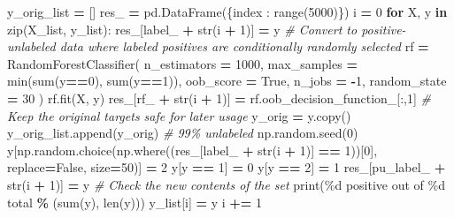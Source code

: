 \documentclass[
  11pt,
  oneside]{book}
\newenvironment{Shaded}{\begin{snugshade}}{\end{snugshade}}
\newcommand{\BuiltInTok}[1]{#1}
\newcommand{\CommentTok}[1]{\textcolor[rgb]{0.56,0.35,0.01}{\textit{#1}}}
\newcommand{\ControlFlowTok}[1]{\textcolor[rgb]{0.13,0.29,0.53}{\textbf{#1}}}
\newcommand{\DecValTok}[1]{\textcolor[rgb]{0.00,0.00,0.81}{#1}}
\newcommand{\KeywordTok}[1]{\textcolor[rgb]{0.13,0.29,0.53}{\textbf{#1}}}
\newcommand{\NormalTok}[1]{#1}
\newcommand{\OperatorTok}[1]{\textcolor[rgb]{0.81,0.36,0.00}{\textbf{#1}}}
\newcommand{\SpecialCharTok}[1]{\textcolor[rgb]{0.00,0.00,0.00}{#1}}
\newcommand{\StringTok}[1]{\textcolor[rgb]{0.31,0.60,0.02}{#1}}
\newcommand{\VariableTok}[1]{\textcolor[rgb]{0.00,0.00,0.00}{#1}}
\begin{document}
\begin{Shaded}
\begin{Highlighting}[]
\NormalTok{y\_orig\_list }\OperatorTok{=}\NormalTok{ []}
\NormalTok{res\_ }\OperatorTok{=}\NormalTok{ pd.DataFrame(\{}\StringTok{\textquotesingle{}index\textquotesingle{}}\NormalTok{ : }\BuiltInTok{range}\NormalTok{(}\DecValTok{5000}\NormalTok{)\})}
\NormalTok{i }\OperatorTok{=} \DecValTok{0}
\ControlFlowTok{for}\NormalTok{ X, y }\KeywordTok{in} \BuiltInTok{zip}\NormalTok{(X\_list, y\_list):}
\NormalTok{    res\_[}\StringTok{\textquotesingle{}label\_\textquotesingle{}} \OperatorTok{+} \BuiltInTok{str}\NormalTok{(i }\OperatorTok{+} \DecValTok{1}\NormalTok{)] }\OperatorTok{=}\NormalTok{ y}
    \CommentTok{\# Convert to positive{-}unlabeled data where labeled positives are conditionally randomly selected}
\NormalTok{    rf }\OperatorTok{=}\NormalTok{ RandomForestClassifier(}
\NormalTok{        n\_estimators }\OperatorTok{=} \DecValTok{1000}\NormalTok{,}
\NormalTok{        max\_samples }\OperatorTok{=} \BuiltInTok{min}\NormalTok{(}\BuiltInTok{sum}\NormalTok{(y}\OperatorTok{==}\DecValTok{0}\NormalTok{), }\BuiltInTok{sum}\NormalTok{(y}\OperatorTok{==}\DecValTok{1}\NormalTok{)),}
\NormalTok{        oob\_score }\OperatorTok{=} \VariableTok{True}\NormalTok{,}
\NormalTok{        n\_jobs }\OperatorTok{=} \OperatorTok{{-}}\DecValTok{1}\NormalTok{,}
\NormalTok{        random\_state }\OperatorTok{=} \DecValTok{30}
\NormalTok{    )}
\NormalTok{    rf.fit(X, y)}
\NormalTok{    res\_[}\StringTok{\textquotesingle{}rf\_\textquotesingle{}} \OperatorTok{+} \BuiltInTok{str}\NormalTok{(i }\OperatorTok{+} \DecValTok{1}\NormalTok{)] }\OperatorTok{=}\NormalTok{ rf.oob\_decision\_function\_[:,}\DecValTok{1}\NormalTok{]}
    \CommentTok{\# Keep the original targets safe for later usage}
\NormalTok{    y\_orig }\OperatorTok{=}\NormalTok{ y.copy()}
\NormalTok{    y\_orig\_list.append(y\_orig)}
    \CommentTok{\# 99\% unlabeled}
\NormalTok{    np.random.seed(}\DecValTok{0}\NormalTok{)}
\NormalTok{    y[np.random.choice(np.where((res\_[}\StringTok{\textquotesingle{}label\_\textquotesingle{}} \OperatorTok{+} \BuiltInTok{str}\NormalTok{(i }\OperatorTok{+} \DecValTok{1}\NormalTok{)] }\OperatorTok{==} \DecValTok{1}\NormalTok{))[}\DecValTok{0}\NormalTok{], replace}\OperatorTok{=}\VariableTok{False}\NormalTok{, size}\OperatorTok{=}\DecValTok{50}\NormalTok{)] }\OperatorTok{=} \DecValTok{2} 
\NormalTok{    y[y }\OperatorTok{==} \DecValTok{1}\NormalTok{] }\OperatorTok{=} \DecValTok{0}
\NormalTok{    y[y }\OperatorTok{==} \DecValTok{2}\NormalTok{] }\OperatorTok{=} \DecValTok{1}
\NormalTok{    res\_[}\StringTok{\textquotesingle{}pu\_label\_\textquotesingle{}} \OperatorTok{+} \BuiltInTok{str}\NormalTok{(i }\OperatorTok{+} \DecValTok{1}\NormalTok{)] }\OperatorTok{=}\NormalTok{ y}
    \CommentTok{\# Check the new contents of the set}
    \BuiltInTok{print}\NormalTok{(}\StringTok{\textquotesingle{}}\SpecialCharTok{\%d}\StringTok{ positive out of }\SpecialCharTok{\%d}\StringTok{ total\textquotesingle{}} \OperatorTok{\%}\NormalTok{ (}\BuiltInTok{sum}\NormalTok{(y), }\BuiltInTok{len}\NormalTok{(y)))}
\NormalTok{    y\_list[i] }\OperatorTok{=}\NormalTok{ y}
\NormalTok{    i }\OperatorTok{+=} \DecValTok{1}
    

\end{Highlighting}
\end{Shaded}
\end{document}
